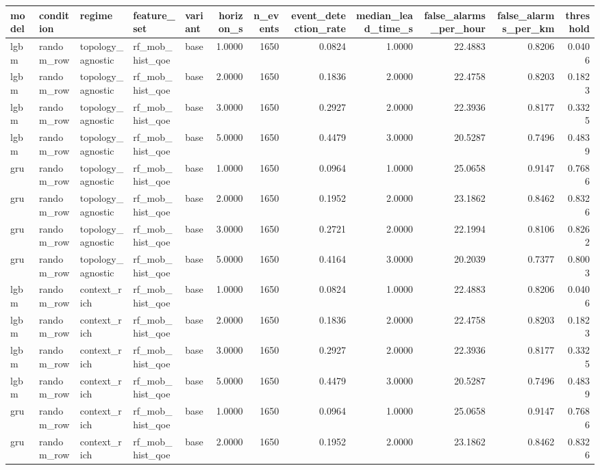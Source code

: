 \begin{tabular}{lllllrrrrrrr}
\toprule
model & condition & regime & feature\_set & variant & horizon\_s & n\_events & event\_detection\_rate & median\_lead\_time\_s & false\_alarms\_per\_hour & false\_alarms\_per\_km & threshold \\
\midrule
lgbm & random\_row & topology\_agnostic & rf\_mob\_hist\_qoe & base & 1.0000 & 1650 & 0.0824 & 1.0000 & 22.4883 & 0.8206 & 0.0406 \\
lgbm & random\_row & topology\_agnostic & rf\_mob\_hist\_qoe & base & 2.0000 & 1650 & 0.1836 & 2.0000 & 22.4758 & 0.8203 & 0.1823 \\
lgbm & random\_row & topology\_agnostic & rf\_mob\_hist\_qoe & base & 3.0000 & 1650 & 0.2927 & 2.0000 & 22.3936 & 0.8177 & 0.3325 \\
lgbm & random\_row & topology\_agnostic & rf\_mob\_hist\_qoe & base & 5.0000 & 1650 & 0.4479 & 3.0000 & 20.5287 & 0.7496 & 0.4839 \\
gru & random\_row & topology\_agnostic & rf\_mob\_hist\_qoe & base & 1.0000 & 1650 & 0.0964 & 1.0000 & 25.0658 & 0.9147 & 0.7686 \\
gru & random\_row & topology\_agnostic & rf\_mob\_hist\_qoe & base & 2.0000 & 1650 & 0.1952 & 2.0000 & 23.1862 & 0.8462 & 0.8326 \\
gru & random\_row & topology\_agnostic & rf\_mob\_hist\_qoe & base & 3.0000 & 1650 & 0.2721 & 2.0000 & 22.1994 & 0.8106 & 0.8262 \\
gru & random\_row & topology\_agnostic & rf\_mob\_hist\_qoe & base & 5.0000 & 1650 & 0.4164 & 3.0000 & 20.2039 & 0.7377 & 0.8003 \\
lgbm & random\_row & context\_rich & rf\_mob\_hist\_qoe & base & 1.0000 & 1650 & 0.0824 & 1.0000 & 22.4883 & 0.8206 & 0.0406 \\
lgbm & random\_row & context\_rich & rf\_mob\_hist\_qoe & base & 2.0000 & 1650 & 0.1836 & 2.0000 & 22.4758 & 0.8203 & 0.1823 \\
lgbm & random\_row & context\_rich & rf\_mob\_hist\_qoe & base & 3.0000 & 1650 & 0.2927 & 2.0000 & 22.3936 & 0.8177 & 0.3325 \\
lgbm & random\_row & context\_rich & rf\_mob\_hist\_qoe & base & 5.0000 & 1650 & 0.4479 & 3.0000 & 20.5287 & 0.7496 & 0.4839 \\
gru & random\_row & context\_rich & rf\_mob\_hist\_qoe & base & 1.0000 & 1650 & 0.0964 & 1.0000 & 25.0658 & 0.9147 & 0.7686 \\
gru & random\_row & context\_rich & rf\_mob\_hist\_qoe & base & 2.0000 & 1650 & 0.1952 & 2.0000 & 23.1862 & 0.8462 & 0.8326 \\

\end{tabular}
